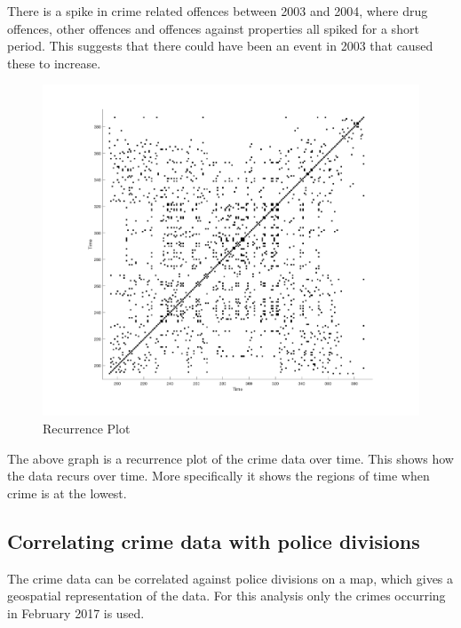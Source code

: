 \documentclass[]{article}
\begin{document}
There is a spike in crime related offences between 2003 and 2004, where drug offences, other offences
and offences against properties all spiked for a short period. This suggests that
there could have been an event in 2003 that caused these to increase.

\begin{figure}[H]
    \caption{Recurrence Plot}
    \centering
    \includegraphics[width=\linewidth]{../images/recurrence_plot}
\end{figure}

The above graph is a recurrence plot of the crime data over time.
This shows how the data recurs over time.
More specifically it shows the regions of time when crime is at the lowest.

\subsection{Correlating crime data with police divisions}

The crime data can be correlated against police divisions on a map, which gives a
geospatial representation of the data.
For this analysis only the crimes occurring in February 2017 is used.
\end{document}
